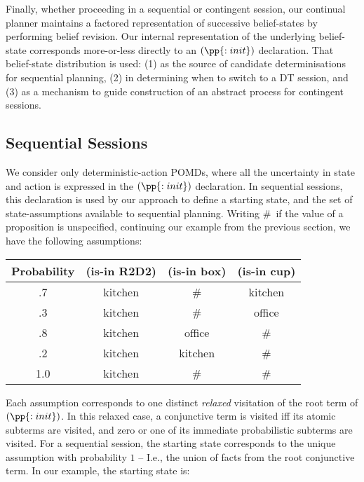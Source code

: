 Finally, whether proceeding in a sequential or contingent session, our
continual planner maintains a factored representation of successive
belief-states by performing belief revision. Our internal
representation of the underlying belief-state corresponds more-or-less
directly to an $(\pp{:init})$ declaration. That belief-state
distribution is used: (1) as the source of candidate determinisations
for sequential planning, (2) in determining when to switch to a DT
session, and (3) as a mechanism to guide construction of an abstract
process for contingent sessions.


\subsection{Sequential Sessions}

We consider only deterministic-action POMDs, where all the uncertainty
in state and action is expressed in the $(\pp{:init})$ declaration. In
sequential sessions, this declaration is used by our approach to
define a starting state, and the set of state-assumptions available to
sequential planning.  Writing \#\ if the value of a proposition is
unspecified, continuing our example from the previous section, we have
the following assumptions:


\small
\begin{tabular}{cccc}
\hline
Probability & (is-in R2D2)  & (is-in box)  & (is-in cup) \\
\hline
.7 & kitchen & \# &  kitchen\\
.3 & kitchen & \# & office \\
.8 & kitchen & office & \# \\
.2 & kitchen & kitchen & \# \\
1.0 & kitchen & \# & \# \\
\hline
\end{tabular}
\normalsize

\noindent Each assumption corresponds to one distinct {\em
relaxed} visitation of the root term of $(\pp{:init})$. In this
relaxed case, a conjunctive term is visited iff its atomic subterms
are visited, and zero or one of its immediate probabilistic subterms
are visited. For a sequential session, the starting state corresponds
to the unique assumption with probability $1$ -- I.e., the union of
facts from the root conjunctive term. In our example, the starting
state is:

